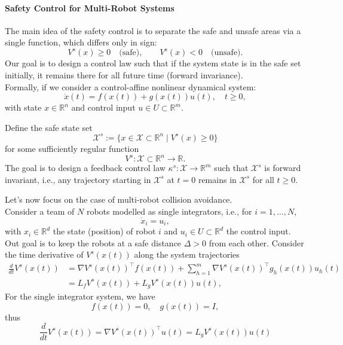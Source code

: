 \paragraph{Safety Control for Multi-Robot Systems}

The main idea of the safety control is to separate the safe and unsafe areas via a single function, which differs only in sign:
\[
V^s(x) \geq 0 \quad \text{(safe)}, \qquad V^s(x) < 0 \quad \text{(unsafe)}.
\]
Our goal is to design a control law such that if the system state is in the safe set initially, it remains there for all future time (forward invariance).  \\
Formally, if we consider a control-affine nonlinear dynamical system:
\[
\dot{x}(t) = f(x(t)) + g(x(t)) u(t), \quad t \geq 0,
\]
with state $x \in \mathbb{R}^n$ and control input $u \in U \subset \mathbb{R}^m$.

Define the safe state set
\[
\mathcal{X}^s := \{ x \in \mathcal{X} \subset \mathbb{R}^n \mid V^s(x) \geq 0 \}
\]
for some sufficiently regular function
\[
V^s : \mathcal{X} \subset \mathbb{R}^n \to \mathbb{R}.
\]
The goal is to design a feedback control law $\kappa^s : \mathcal{X} \to \mathbb{R}^m$ such that $\mathcal{X}^s$ is forward invariant, i.e., any trajectory starting in $\mathcal{X}^s$ at $t=0$ remains in $\mathcal{X}^s$ for all $t \geq 0$.

\medskip
Let's now focus on the case of multi-robot collision avoidance. \\
Consider a team of $N$ robots modelled as single integrators, i.e., for $i = 1, \ldots, N$,
\[
\dot{x}_i = u_i,
\]
with $x_i \in \mathbb{R}^d$ the state (position) of robot $i$ and $u_i \in U \subset \mathbb{R}^d$ the control input.
Out goal is to keep the robots at a safe distance $\Delta > 0$ from each other.
Consider the time derivative of $V^s(x(t))$ along the system trajectories
\begin{align*}
\frac{d}{dt} V^s(x(t)) &= \nabla V^s(x(t))^\top f(x(t)) + \sum_{h=1}^m \nabla V^s(x(t))^\top g_h(x(t)) u_h(t) \\
&= L_f V^s(x(t)) + L_g V^s(x(t)) u(t),    
\end{align*}
For the single integrator system, we have
\[
f(x(t)) = 0, \quad g(x(t)) = I,
\]
thus
\[
\frac{d}{dt} V^s(x(t)) = \nabla V^s(x(t))^\top u(t) = L_gV^s(x(t)) u(t) 
\]

